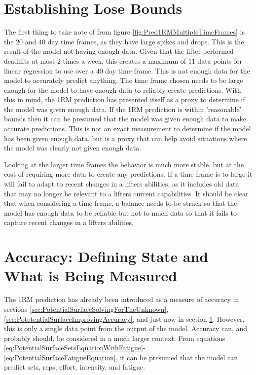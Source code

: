 \section{Establishing Lose Bounds}
\label{sec:TimeFrameEstablishingLooseBounds}

The first thing to take note of from figure \ref{fig:Pred1RMMultipleTimeFrames} is the $20$ and $40$ day time frames, as they have large spikes and drops. This is the result of the model not having enough data. Given that the lifter performed deadlifts at most $2$ times a week, this creates a maximum of $11$ data points for linear regression to use over a $40$ day time frame. This is not enough data for the model to accurately predict anything. The time frame chosen needs to be large enough for the model to have enough data to reliably create predictions. With this in mind, the 1RM prediction has presented itself as a proxy to determine if the model was given enough data. If the 1RM prediction is within 'reasonable' bounds then it can be presumed that the model was given enough data to make accurate predictions. This is not an exact measurement to determine if the model has been given enough data, but is a proxy that can help avoid situations where the model was clearly not given enough data.

Looking at the larger time frames the behavior is much more stable, but at the cost of requiring more data to create any predictions. If a time frame is to large it will fail to adapt to recent changes in a lifters abilities, as it includes old data that may no longer be relevant to a lifters current capabilities. It should be clear that when considering a time frame, a balance needs to be struck so that the model has enough data to be reliable but not to much data so that it fails to capture recent changes in a lifters abilities.

\section{Accuracy: Defining State and What is Being Measured}
\label{sec:TimeFrameWhatIsBeingMeasured}

The 1RM prediction has already been introduced as a measure of accuracy in sections \ref{sec:PotentialSurfaceSolvingForTheUnknown}, \ref{sec:PotetentialSurfaceImprovingAccuracy}, and just now in section \ref{sec:TimeFrameEstablishingLooseBounds}. However, this is only a single data point from the output of the model. Accuracy can, and probably should, be considered in a much larger context. From equations \ref{eq:PotentialSurfaceSetsEquationWithFatigue}-\ref{eq:PotentialSurfaceFatigueEquation}, it can be presumed that the model can predict sets, reps, effort, intensity, and fatigue.


